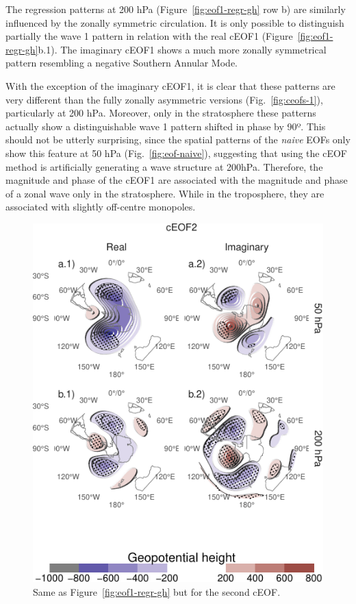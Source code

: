 \documentclass[smallextended]{svjour3}       %
\begin{document}
The regression patterns at 200 hPa (Figure~\ref{fig:eof1-regr-gh} row b) are similarly influenced by the zonally symmetric circulation. It is only possible to distinguish partially the wave 1 pattern in relation with the real cEOF1 (Figure~\ref{fig:eof1-regr-gh}b.1). The imaginary cEOF1 shows a much more zonally symmetrical pattern resembling a negative Southern Annular Mode.

With the exception of the imaginary cEOF1, it is clear that these patterns are very different than the fully zonally asymmetric versions (Fig.~\ref{fig:ceofs-1}), particularly at 200 hPa. Moreover, only in the stratosphere these patterns actually show a distinguishable wave 1 pattern shifted in phase by 90º. This should not be utterly surprising, since the spatial patterns of the \emph{naive} EOFs only show this feature at 50 hPa (Fig.~\ref{fig:eof-naive}), suggesting that using the cEOF method is artificially generating a wave structure at 200hPa. Therefore, the magnitude and phase of the cEOF1 are associated with the magnitude and phase of a zonal wave only in the stratosphere. While in the troposphere, they are associated with slightly off-centre monopoles.



\begin{figure}
\centering
\includegraphics{../figures/eof2-regr-gh-1.pdf}
\caption{\label{fig:eof2-regr-gh}Same as Figure~\ref{fig:eof1-regr-gh} but for the second cEOF.}
\end{figure}
\end{document}
